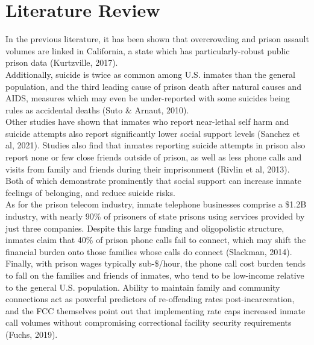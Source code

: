 \documentclass[12pt,a4paper]{article}
\begin{document}
\section{Literature Review}
In the previous literature, it has been shown that overcrowding and prison assault volumes are linked in California, a state which has particularly-robust public prison data (Kurtzville, 2017). \\

Additionally, suicide is twice as common among U.S. inmates than the general population, and the third leading cause of prison death after natural causes and AIDS, measures which may even be under-reported with some suicides being rules as accidental deaths (Suto \& Arnaut, 2010). \\

Other studies have shown that inmates who report near-lethal self harm and suicide attempts also report significantly lower social support levels (Sanchez et al, 2021). Studies also find that inmates reporting suicide attempts in prison also report none or few close friends outside of prison, as well as less phone calls and visits from family and friends during their imprisonment (Rivlin et al, 2013). Both of which demonstrate prominently that social support can increase inmate feelings of belonging, and reduce suicide risks. \\

As for the prison telecom industry, inmate telephone businesses comprise a \$1.2B industry, with nearly 90\% of prisoners of state prisons using services provided by just three companies. Despite this large funding and oligopolistic structure, inmates claim that 40\% of prison phone calls fail to connect, which may shift the financial burden onto those families whose calls do connect (Slackman, 2014). \\

Finally, with prison wages typically sub-\$/hour, the phone call cost burden tends to fall on the families and friends of inmates, who tend to be low-income relative to the general U.S. population. Ability to maintain family and community connections act as powerful predictors of re-offending rates post-incarceration, and the FCC themselves point out that implementing rate caps increased inmate call volumes without compromising correctional facility security requirements (Fuchs, 2019). 

\end{document}
